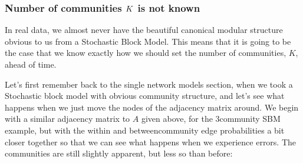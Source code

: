 \documentclass[letterpaper,10pt,english]{jupyterBook}
\begin{document}
\subsubsection{Number of communities \protect\(K\protect\) is not known}
\label{\detokenize{representations/ch6/estimating-parameters_spectral:number-of-communities-k-is-not-known}}
\sphinxAtStartPar
In real data, we almost never have the beautiful canonical modular structure obvious to us from a Stochastic Block Model. This means that it is  going to be the case that we know exactly how we should set the number of communities, \(K\), ahead of time.

\sphinxAtStartPar
Let’s first remember back to the single network models section, when we took a Stochastic block model with obvious community structure, and let’s see what happens when we just move the nodes of the adjacency matrix around. We begin with a similar adjacency matrix to \(A\) given above, for the \(3\)\sphinxhyphen{}community SBM example, but with the within and between\sphinxhyphen{}community edge probabilities a bit closer together so that we can see what happens when we experience errors. The communities are still slightly apparent, but less so than before:

\begin{sphinxVerbatim}[commandchars=\\\{\}]
  \PYG{p}{[}\PYG{p}{[}  \PYG{p}{]}
     \PYG{p}{[}  \PYG{p}{]}
     \PYG{p}{[}  \PYG{p}{]}\PYG{p}{]}
     

  \PYG{p}{[}    \PYG{p}{[}\PYG{p}{]}\PYG{p}{]}  \PYG{p}{[}     \PYG{p}{[}\PYG{p}{]}\PYG{p}{]}  \PYG{p}{[}     \PYG{p}{[}\PYG{p}{]}\PYG{p}{]}
    
\end{sphinxVerbatim}
\end{document}
